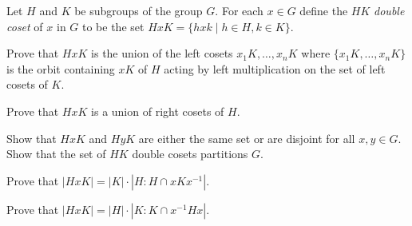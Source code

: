 \newpage

\begin{specialexercise}
	Let $H$ and $K$ be subgroups of the group $G$. For each $x \in G$ define the $HK$ \emph{double coset} of $x$ in $G$ to be the set $HxK = \{hxk \mid h \in H, k \in K\}$.
	\begin{subproblems}
		\item Prove that $HxK$ is the union of the left cosets $x_1K, \ldots, x_nK$ where $\{x_1K, \ldots, x_nK\}$ is the orbit containing $xK$ of $H$ acting by left multiplication on the set of left cosets of $K$.
		\item Prove that $HxK$ is a union of right cosets of $H$.
		\item Show that $HxK$ and $HyK$ are either the same set or are disjoint for all $x, y \in G$. Show that the set of $HK$ double cosets partitions $G$.
		\item Prove that $|HxK| = |K| \cdot |H : H \cap xKx^{-1}|$.
		\item Prove that $|HxK| = |H| \cdot |K : K \cap x^{-1}Hx|$.
	\end{subproblems}
\end{specialexercise}


